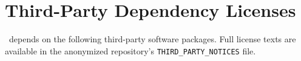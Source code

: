 \clearpage
\section{Third-Party Dependency Licenses}
\label{app:license}
\framework~depends on the following third-party software packages. 
Full license texts are available in the anonymized repository's 
\texttt{THIRD\_PARTY\_NOTICES} file.

